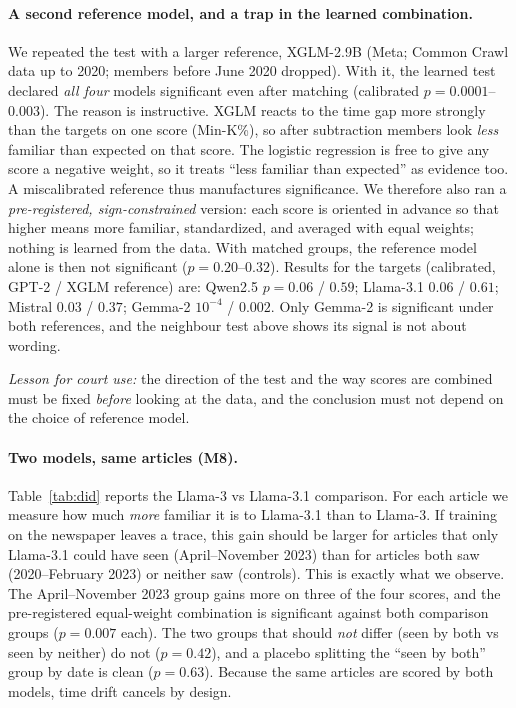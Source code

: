 \documentclass[10pt,a4paper]{article}
\begin{document}
\paragraph{A second reference model, and a trap in the learned combination.} We repeated the test with a larger
reference, XGLM-2.9B (Meta; Common Crawl data up to 2020; members before June 2020 dropped). With it, the learned test
declared \emph{all four} models significant even after matching (calibrated $p=0.0001$--$0.003$). The reason is
instructive. XGLM reacts to the time gap more strongly than the targets on one score (Min-K\%), so after
subtraction members look \emph{less} familiar than expected on that score. The logistic regression is free to give
any score a negative weight, so it treats ``less familiar than expected'' as evidence too. A miscalibrated reference
thus manufactures significance. We therefore also ran a \emph{pre-registered, sign-constrained} version: each score
is oriented in advance so that higher means more familiar, standardized, and averaged with equal weights; nothing is
learned from the data. With matched groups, the reference model alone is then not significant ($p=0.20$--$0.32$).
Results for the targets (calibrated, GPT-2 / XGLM reference) are: Qwen2.5 $p=0.06$ / $0.59$; Llama-3.1 $0.06$ /
$0.61$; Mistral $0.03$ / $0.37$; Gemma-2 $10^{-4}$ / $0.002$. Only Gemma-2 is significant under both references,
and the neighbour test above shows its signal is not about wording.

\emph{Lesson for court use:} the direction of the test and the way scores are combined must be fixed \emph{before}
looking at the data, and the conclusion must not depend on the choice of reference model.

\paragraph{Two models, same articles (M8).} Table~\ref{tab:did} reports the Llama-3 vs Llama-3.1 comparison. For
each article we measure how much \emph{more} familiar it is to Llama-3.1 than to Llama-3. If training on the
newspaper leaves a trace, this gain should be larger for articles that only Llama-3.1 could have seen (April--November
2023) than for articles both saw (2020--February 2023) or neither saw (controls). This is exactly what we observe. The
April--November 2023 group gains more on three of the four scores, and the pre-registered equal-weight combination is
significant against both comparison groups ($p=0.007$ each). The two groups that should \emph{not} differ (seen by
both vs seen by neither) do not ($p=0.42$), and a placebo splitting the ``seen by both'' group by date is clean
($p=0.63$). Because the same articles are scored by both models, time drift cancels by design.
\end{document}
